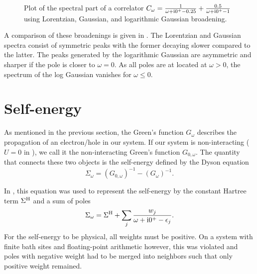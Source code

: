 \begin{figure}[ht]
    \centering
    
    \caption{
        Plot of the spectral part of a correlator
        $C_\omega = \frac{1}{\omega + \mathrm{i}0^+ - 0.25} + \frac{0.5}{\omega + \mathrm{i}0^+ - 1}$
        using Lorentzian, Gaussian, and logarithmic Gaussian broadening.
    }
    \label{fig:broadening}
\end{figure}

A comparison of these broadenings is given in .
The Lorentzian and Gaussian spectra consist of symmetric peaks
with the former decaying slower compared to the latter.
The peaks generated by the logarithmic Gaussian are asymmetric
and sharper if the pole is closer to $\omega=0$.
As all poles are at located at $\omega>0$,
the spectrum of the log Gaussian vanishes for $\omega\le0$.

\section{Self-energy}
\label{sec:self-energy}

As mentioned in the previous section,
the Green's function $G_\omega$ describes the propagation of an electron/hole in our system.
If our system is non-interacting ($U=0$ in ),
we call it the non-interacting Green's function $G_{0, \omega}$.
The quantity that connects these two objects is the self-energy defined by the Dyson equation
\begin{equation}
    \Sigma_\omega = (G_{0, \omega})^{-1} - (G_\omega)^{-1}.
    \label{eq:dyson}
\end{equation}

In \cite{Lu2014},
this equation was used to represent the self-energy by the constant Hartree term $\Sigma^{\mathrm{H}}$
and a sum of poles
\begin{equation}
    \Sigma_\omega = \Sigma^{\mathrm{H}} + \sum_j \frac{w_j}{\omega + \mathrm{i}0^+ - \epsilon_j}.
    \label{eq:self-energy-sum-of-poles}
\end{equation}
For the self-energy to be physical, all weights must be positive.
On a system with finite bath sites and floating-point arithmetic however,
this was violated and poles with negative weight had to be merged into neighbors
such that only positive weight remained.

